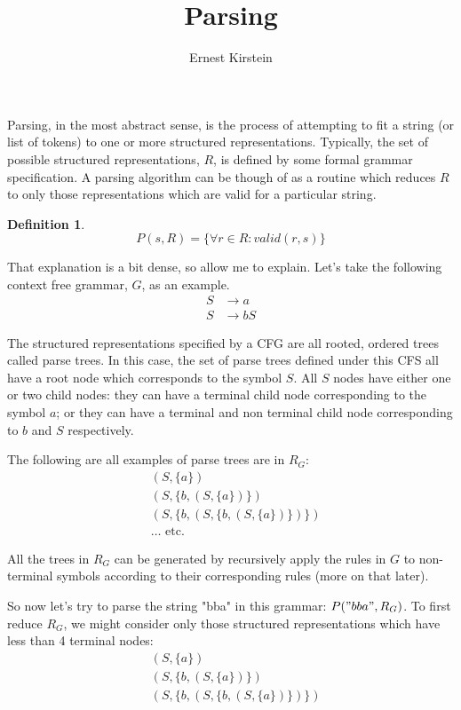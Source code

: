 \documentclass[11pt]{article}
\begin{document}
\title{Parsing}
\author{Ernest Kirstein}
\maketitle

Parsing, in the most abstract sense, is the process of attempting to fit a string (or list of tokens) to one or more structured representations.
Typically, the set of possible structured representations, $R$, is defined by some formal grammar specification.
\cite{lewis, compiler, anatomy, formal_langs}
A parsing algorithm can be though of as a routine which reduces $R$ to only those representations which are valid for a particular string.

\newtheorem{parse}{Definition}
\begin{parse}
\[ P(s, R) = \{ \forall r \in R : valid(r,s) \} \]
\end{parse}

That explanation is a bit dense, so allow me to explain.
Let's take the following context free grammar, $G$, as an example.
\begin{align*}
S &\rightarrow a \\
S &\rightarrow b S
\end{align*}

The structured representations specified by a CFG are all rooted, ordered trees called parse trees. \cite{formal_langs}
In this case, the set of parse trees defined under this CFS all have a root node which corresponds to the symbol $S$.
All $S$ nodes have either one or two child nodes:
they can have a terminal child node corresponding to the symbol $a$;
or they can have a terminal and non terminal child node corresponding to $b$ and $S$ respectively.

The following are all examples of parse trees are in $R_G$:
\begin{align*}
&(S, \{a\}) \\
&(S, \{b, (S, \{a\})\}) \\
&(S, \{b, (S, \{b, (S, \{a\})\})\}) \\
&\ldots \text{ etc.}
\end{align*}

All the trees in $R_G$ can be generated by recursively apply the rules in $G$ to non-terminal symbols according to
their corresponding rules (more on that later). \cite{formal_langs}

So now let's try to parse the string "bba" in this grammar: $P("bba", R_G)$.
To first reduce $R_G$, we might consider only those structured representations which have less than 4 terminal nodes:
\begin{align*}
&(S, \{a\}) \\
&(S, \{b, (S, \{a\})\}) \\
&(S, \{b, (S, \{b, (S, \{a\})\})\})
\end{align*}
\end{document}
